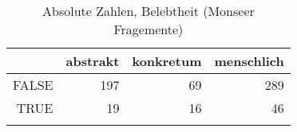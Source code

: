 \begin{table}[ht]
\centering
\begin{tabular}{rrrr}
  \lsptoprule
 & abstrakt & konkretum & menschlich \\ 
  \midrule
FALSE & 197 &  69 & 289 \\ 
  TRUE &  19 &  16 &  46 \\ 
   \lspbottomrule
\end{tabular}
\caption{Absolute Zahlen, Belebtheit  (Monseer Fragemente)} 
\end{table}
